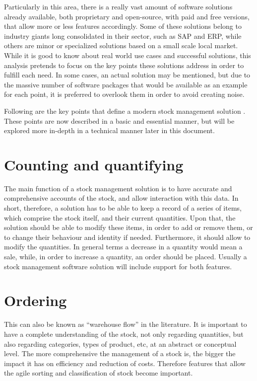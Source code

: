Particularly in this area, there is a really vast amount of software solutions already available, both proprietary and open-source, with paid and free versions, that allow more or less features accordingly. Some of these solutions belong to industry giants long consolidated in their sector, such as SAP and ERP, while others are minor or specialized solutions based on a small scale local market.
While it is good to know about real world use cases and successful solutions, this analysis pretends to focus on the key points these solutions address in order to fulfill each need. In some cases, an actual solution may be mentioned, but due to the massive number of software packages that would be available as an example for each point, it is preferred to overlook them in order to avoid creating noise.

Following are the key points that define a modern stock management solution \cite{3}. These points are now described in a basic and essential manner, but will be explored more in-depth in a technical manner later in this document.

\section{Counting and quantifying}
The main function of a stock management solution is to have accurate and comprehensive accounts of the stock, and allow interaction with this data. In short, therefore, a solution has to be able to keep a record of a series of items, which comprise the stock itself, and their current quantities.
Upon that, the solution should be able to modify these items, in order to add or remove them, or to change their behaviour and identity if needed.
Furthermore, it should allow to modify the quantities. In general terms a decrease in a quantity would mean a sale, while, in order to increase a quantity, an order should be placed. Usually a stock management software solution will include support for both features.
\section{Ordering}
This can also be known as “warehouse flow” in the literature. It is important to have a complete understanding of the stock, not only regarding quantities, but also regarding categories, types of product, etc, at an abstract or conceptual level. The more comprehensive the management of a stock is, the bigger the impact it has on efficiency and reduction of costs. Therefore features that allow the agile sorting and classification of stock become important.
